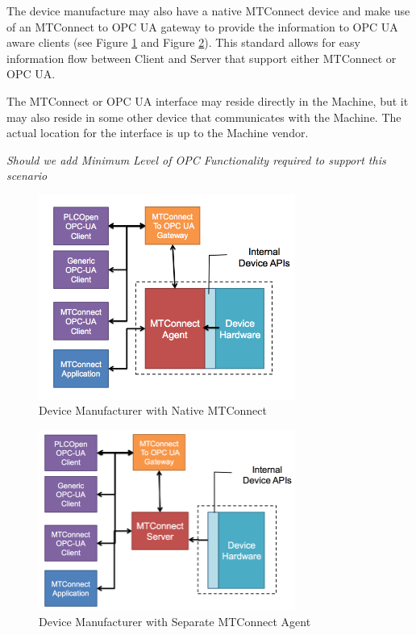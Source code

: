 \documentclass{mtconnect}	%
\begin{document}
The device manufacture may also have a native MTConnect device and make use of an MTConnect to OPC UA gateway to provide the information to OPC UA aware clients (see Figure \ref{fig:device_mfg_native} and Figure \ref{fig:device_mfg_separate}). This standard allows for easy information flow between Client and Server that support either MTConnect or OPC UA.

The MTConnect or OPC UA interface may reside directly in the Machine, but it may also reside in some other device that communicates with the Machine. The actual location for the interface is up to the Machine vendor.

\textit{Should we add Minimum Level of OPC Functionality required to support this scenario}

\begin{figure}[h]
  \centering
  \includegraphics[width=0.75\textwidth]{diagrams/DeviceManufacturerNativeMTConnect.png}
  \caption{Device Manufacturer with Native MTConnect}
  \label{fig:device_mfg_native}
\end{figure}

\begin{figure}[h]
  \centering
  \includegraphics[width=0.75\textwidth]{diagrams/DeviceManufacturerSeparateAgent.png}
  \caption{Device Manufacturer with Separate MTConnect Agent}
  \label{fig:device_mfg_separate}
\end{figure}
\end{document}
